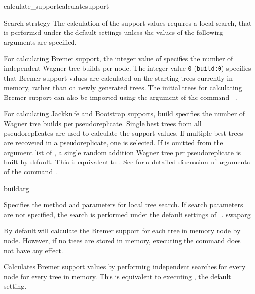 \begin{command}{calculate\_support}{calculatesupport}
\begin{arguments}
\begin{argumentgroup}{Search strategy}
{The calculation of the support values requires a local search,
that is performed under the default settings unless the values
of the following arguments are specified.}

{For calculating Bremer support, the integer value of
 specifies the number of independent
Wagner tree builds per node. The integer value \texttt{0}
(\texttt{build:0}) specifies that Bremer support values are
calculated on the starting trees currently
in memory, rather than on newly generated trees.
The initial trees for calculating Bremer support
can also be imported using the argument 
of the command ~.

\setlength{\parindent}{0.5cm}                
\indent 
For calculating Jackknife
and Bootstrap supports, build specifies the number of
Wagner tree builds per pseudoreplicate. Single best trees from all
pseudoreplicates are used to calculate the support values. If
multiple best trees are recovered in a pseudoreplicate, one 
is selected. If  is
omitted from the argument list of ,
a single random addition Wagner tree per
pseudoreplicate is built by default. This is equivalent to 
. See
 for a detailed discussion of
arguments of the command .}
{buildarg}

{Specifies the method and parameters for local tree search. If search
parameters are not specified, the search is performed under
the default settings of ~.} 
{swaparg}

\end{argumentgroup}

\end{arguments}

{By default \poy will calculate the Bremer support for each tree
in memory node by node. However, if no trees are stored in memory,
executing the command  does not
have any effect.}

\begin{poyexamples} 

{Calculates Bremer support values by performing independent searches
for every node for every tree in memory. This is equivalent to
executing , the default setting.}


\end{poyexamples}
\end{command}
